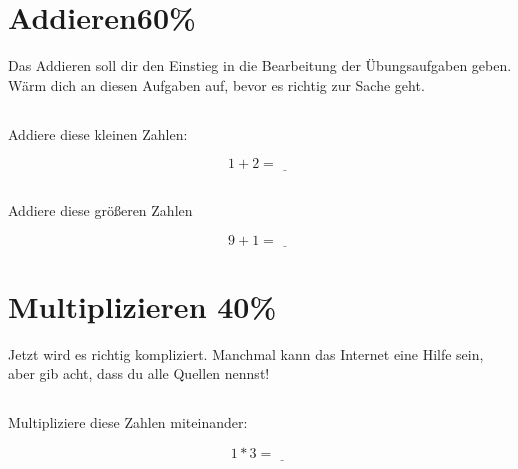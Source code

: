 \documentclass[utf]{uhb-inf}
\begin{document}
\section{Addieren\hfill 60\%}

Das Addieren soll dir den Einstieg in die Bearbeitung der Übungsaufgaben geben. Wärm dich an diesen Aufgaben auf, bevor es richtig zur Sache geht.

\subsection{}

Addiere diese kleinen Zahlen:

\[ 1 + 2 = \underline{\quad} \]

\subsection{}

Addiere diese größeren Zahlen

\[ 9 + 1 = \underline{\quad} \]

\section{Multiplizieren \hfill 40\%}

Jetzt wird es richtig kompliziert. Manchmal kann das Internet eine Hilfe sein, aber gib acht, dass du alle Quellen nennst!

\subsection{}

Multipliziere diese Zahlen miteinander:

\[ 1 * 3 = \underline{\quad} \]
\end{document}
